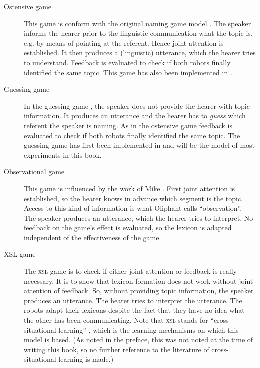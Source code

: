 \begin{description}
\item[Ostensive game] This game is conform with the original naming game model \citep{steels:1996a}. The speaker informs the hearer prior to the linguistic communication what the topic is, e.g. by means of pointing at the referent. Hence joint attention is established. It then produces a (linguistic) utterance, which the hearer tries to understand. Feedback is evaluated to check if both robots finally identified the same topic. This game has also been implemented in \citealt{steelsvogt:1997}.

\item[Guessing game] In the guessing game \citep{steelskaplan:1999}, the speaker does not provide the hearer with topic information. It produces an utterance and the hearer has to {\em guess} which referent the speaker is naming. As in the ostensive game feedback is evaluated to check if both robots finally identified the same topic. The guessing game has first been implemented in \citealt{vogt:1998c} and will be the model of most experiments in this book.

\item[Observational game] This game is influenced by the work of Mike \citet{oliphant:1997}. First joint attention is established, so the hearer knows in advance which segment is the topic. Access to this kind of information is what Oliphant calls ``observation''. The speaker produces an utterance, which the hearer tries to interpret. No feedback on the game's effect is evaluated, so the lexicon is adapted independent of the effectiveness of the game.

\item[XSL game] The {\scshape xsl} game is to check if either joint attention or feedback is really necessary. It is to show that lexicon formation does not work without joint attention of feedback. So, without providing topic information, the speaker produces an utterance. The hearer tries to interpret the utterance. The robots adapt their lexicons despite the fact that they have no idea what the other has been communicating. Note that {\scshape xsl} stands for ``cross-situational learning'' \citep{pinker:1989,siskind:1996}, which is the learning mechanisms on which this model is based. (As noted in the preface, this was not noted at the time of writing this book, so no further reference to the literature of cross-situational learning is made.)
\end{description}

